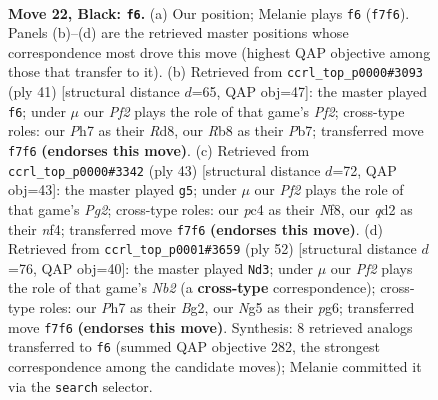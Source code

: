 \documentclass[11pt]{article}
\begin{document}
\clearpage

\begin{figure}[p]\centering
\begin{subfigure}{0.46\textwidth}\centering
\resizebox{\linewidth}{!}{%
\newchessgame
\chessboard[
  setfen={1r2q1k1/p1pp1ppp/8/6n1/1pPP4/8/P1PQBP1P/1R4K1 b - - 0 22},
  showmover=false,
  pgfstyle=straightmove, color=movearrow, markmove={f7-f6}
]}
\caption{}
\end{subfigure}\hfill
\begin{subfigure}{0.46\textwidth}\centering
\resizebox{\linewidth}{!}{%
\newchessgame
\chessboard[
  setfen={2kr4/1pq2p1p/p3p2B/2P1n1p1/8/8/PP2QPPP/R5K1 b - - 1 21},
  showmover=false,
  pgfstyle=straightmove, color=movearrow, markmove={f7-f6}
]}
\caption{}
\end{subfigure}
\\[4pt]
\begin{subfigure}{0.46\textwidth}\centering
\resizebox{\linewidth}{!}{%
\newchessgame
\chessboard[
  setfen={5nk1/pp1r2p1/2q4p/3p4/3P1N2/1QP5/P5PP/4R1K1 b - - 3 22},
  showmover=false,
  pgfstyle=straightmove, color=movearrow, markmove={g7-g5}
]}
\caption{}
\end{subfigure}\hfill
\begin{subfigure}{0.46\textwidth}\centering
\resizebox{\linewidth}{!}{%
\newchessgame
\chessboard[
  setfen={1rbq2k1/6bp/4ppp1/1p6/3P1P2/2Q1P3/1N3PBP/3R2K1 w - - 1 27},
  showmover=false,
  pgfstyle=straightmove, color=movearrow, markmove={b2-d3}
]}
\caption{}
\end{subfigure}
\caption{\textbf{Move 22, Black: \texttt{f6}.} (a) Our position; Melanie plays \texttt{f6} (\texttt{f7f6}). Panels (b)--(d) are the retrieved master positions whose correspondence most drove this move (highest QAP objective among those that transfer to it). (b) Retrieved from \texttt{ccrl\_top\_p0000\#3093} (ply 41) [structural distance $d$=65, QAP obj=47]: the master played \texttt{f6}; under $\mu$ our \emph{Pf2} plays the role of that game's \emph{Pf2}; cross-type roles: our \emph{P}h7 as their \emph{R}d8, our \emph{R}b8 as their \emph{P}b7; transferred move \texttt{f7f6} \textbf{(endorses this move)}. (c) Retrieved from \texttt{ccrl\_top\_p0000\#3342} (ply 43) [structural distance $d$=72, QAP obj=43]: the master played \texttt{g5}; under $\mu$ our \emph{Pf2} plays the role of that game's \emph{Pg2}; cross-type roles: our \emph{p}c4 as their \emph{N}f8, our \emph{q}d2 as their \emph{n}f4; transferred move \texttt{f7f6} \textbf{(endorses this move)}. (d) Retrieved from \texttt{ccrl\_top\_p0001\#3659} (ply 52) [structural distance $d$=76, QAP obj=40]: the master played \texttt{Nd3}; under $\mu$ our \emph{Pf2} plays the role of that game's \emph{Nb2} (a \textbf{cross-type} correspondence); cross-type roles: our \emph{P}h7 as their \emph{B}g2, our \emph{N}g5 as their \emph{p}g6; transferred move \texttt{f7f6} \textbf{(endorses this move)}. Synthesis: 8 retrieved analogs transferred to \texttt{f6} (summed QAP objective 282, the strongest correspondence among the candidate moves); Melanie committed it via the \texttt{search} selector.}
\label{fig:thought-m43}
\end{figure}
\end{document}
